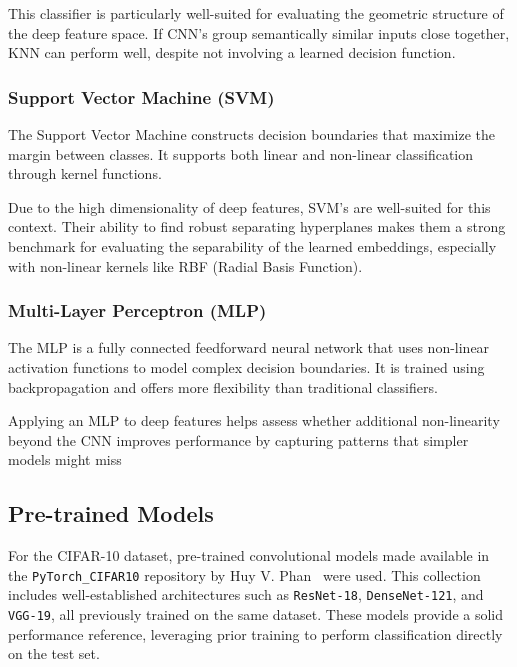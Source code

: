 \documentclass[journal,article,submit,pdftex,moreauthors]{Definitions/mdpi}
\begin{document}
This classifier is particularly well-suited for evaluating the geometric structure of the deep feature space. If CNN's group semantically similar inputs close together, KNN can perform well, despite not involving a learned decision function.

\subsubsection*{Support Vector Machine (SVM)}

The Support Vector Machine constructs decision boundaries that maximize the margin between classes. It supports both linear and non-linear classification through kernel functions.

Due to the high dimensionality of deep features, SVM's are well-suited for this context. Their ability to find robust separating hyperplanes makes them a strong benchmark for evaluating the separability of the learned embeddings, especially with non-linear kernels like RBF (Radial Basis Function).

\subsubsection*{Multi-Layer Perceptron (MLP)}

The MLP is a fully connected feedforward neural network that uses non-linear activation functions to model complex decision boundaries. It is trained using backpropagation and offers more flexibility than traditional classifiers.

Applying an MLP to deep features helps assess whether additional non-linearity beyond the CNN improves performance by capturing patterns that simpler models might miss


\subsection{Pre-trained Models}
\label{sec:pretrained_models}

For the CIFAR-10 dataset, pre-trained convolutional models made available in the \texttt{PyTorch\_CIFAR10} repository by Huy V. Phan~\cite{huyvnphan_pytorch_cifar10} were used. This collection includes well-established architectures such as \texttt{ResNet-18}, \texttt{DenseNet-121}, and \texttt{VGG-19}, all previously trained on the same dataset. These models provide a solid performance reference, leveraging prior training to perform classification directly on the test set.
\end{document}
